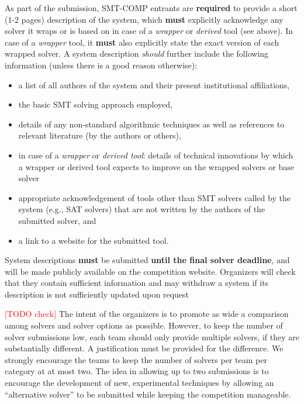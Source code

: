 \documentclass[12pt]{article}
\newcommand{\rem}[1]{\textcolor{red}{[#1]}}
\newcommand{\todo}[1]{\rem{TODO #1}}
\begin{document}
%
As part of the submission, SMT-COMP entrants are \textbf{required} to provide a
short (1-2 pages) description of the system, which \textbf{must} explicitly
acknowledge any solver it wraps or is based on in case of a \emph{wrapper} or
\emph{derived} tool (see above).
In case of a \emph{wrapper} tool, it \textbf{must} also explicitly state
the exact version of each wrapped solver.
A system description \emph{should} further include the following information
(unless there is a good reason otherwise):
\begin{itemize}[itemsep=0ex]
  \item a list of all authors of the system and their present institutional
    affiliations,
  \item the basic SMT solving approach employed,
  \item details of any non-standard algorithmic techniques as well as
    references to relevant literature (by the authors or others),
  \item in case of a \emph{wrapper} or \emph{derived tool}: details of
    technical innovations by which a wrapper or derived tool expects to improve
    on the wrapped solvers or base solver
  \item appropriate acknowledgement of tools other than SMT solvers called by
    the system (e.g., SAT solvers) that are not written by the authors of the
    submitted solver, and
  \item a link to a website for the submitted tool.
\end{itemize}
System descriptions \textbf{must} be submitted \textbf{until the final solver
deadline}, and will be made publicly available on the competition website.
Organizers will check that they contain sufficient information
and may withdraw a system if its description is not sufficiently updated upon
request

\todo{check}
%
The intent of the organizers is to promote as wide a comparison among
solvers and solver options as possible.  However, to keep the number of
solver submissions low, each team should only provide multiple solvers,
if they are  substantially different.  A justification must be provided
for the difference.  We strongly encourage the teams to keep the number
of solvers per team per category at at most two.  The idea in allowing
up to two submissions is to encourage the development of new,
experimental techniques by allowing an ``alternative solver'' to be
submitted while keeping the competition manageable.
\end{document}

